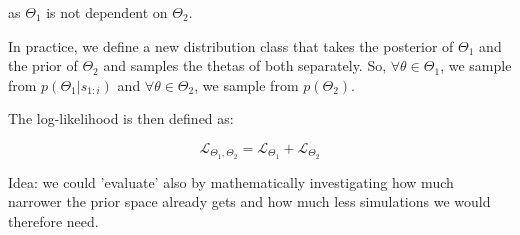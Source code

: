 \documentclass[12pt]{report}
\begin{document}
as $\Theta_1$ is not dependent on $\Theta_2$.

In practice, we define a new distribution class that takes the posterior of $\Theta_1$ and the prior of $\Theta_2$ and samples the thetas of both separately. So, $\forall \theta \in \Theta_1$, we sample from $p(\Theta_1|s_{1:i} )$ and $\forall \theta \in \Theta_2$, we sample from $p(\Theta_2)$.

The log-likelihood is then defined as:

$$ \mathcal{L}_{\Theta_1,\Theta_2} = \mathcal{L}_{\Theta_1} + \mathcal{L}_{\Theta_2}$$




Idea: we could 'evaluate' also by mathematically investigating how much narrower the prior space already gets and how much less simulations we would therefore need.





\end{document}
